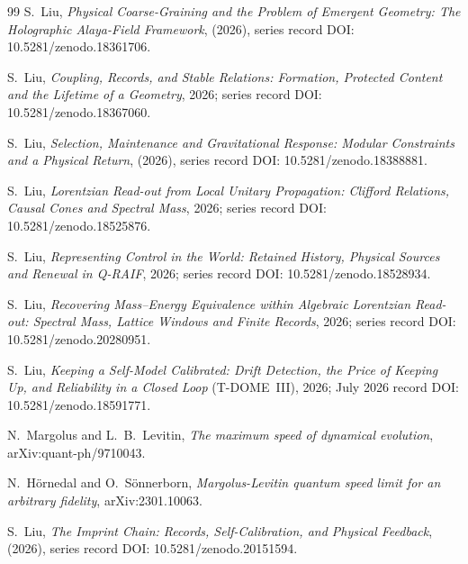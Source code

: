 \documentclass[aps,pre,onecolumn,superscriptaddress,floatfix,longbibliography]{revtex4-2}
\begin{document}
\begin{thebibliography}{99}
S.~Liu, \emph{Physical Coarse-Graining and the Problem of Emergent Geometry: The Holographic Alaya-Field Framework}, (2026), series record DOI: 10.5281/zenodo.18361706.

S.~Liu, \emph{Coupling, Records, and Stable Relations: Formation, Protected Content and the Lifetime of a Geometry}, 2026; series record DOI: 10.5281/zenodo.18367060.

S.~Liu, \emph{Selection, Maintenance and Gravitational Response: Modular Constraints and a Physical Return}, (2026), series record DOI: 10.5281/zenodo.18388881.

S.~Liu, \emph{Lorentzian Read-out from Local Unitary Propagation: Clifford Relations, Causal Cones and Spectral Mass}, 2026; series record DOI: 10.5281/zenodo.18525876.

S.~Liu, \emph{Representing Control in the World: Retained History, Physical Sources and Renewal in Q-RAIF}, 2026; series record DOI: 10.5281/zenodo.18528934.

S.~Liu, \emph{Recovering Mass--Energy Equivalence within Algebraic Lorentzian Read-out: Spectral Mass, Lattice Windows and Finite Records}, 2026; series record DOI: 10.5281/zenodo.20280951.

S.~Liu, \emph{Keeping a Self-Model Calibrated: Drift Detection, the Price of Keeping Up, and Reliability in a Closed Loop} (T-DOME~III), 2026; July 2026 record DOI: 10.5281/zenodo.18591771.

N.~Margolus and L.~B.~Levitin, \emph{The maximum speed of dynamical evolution}, arXiv:quant-ph/9710043.

N.~H\"ornedal and O.~S\"onnerborn, \emph{Margolus-Levitin quantum speed limit for an arbitrary fidelity}, arXiv:2301.10063.

S.~Liu, \emph{The Imprint Chain: Records, Self-Calibration, and Physical Feedback}, (2026), series record DOI: 10.5281/zenodo.20151594.

\end{thebibliography}
\end{document}
